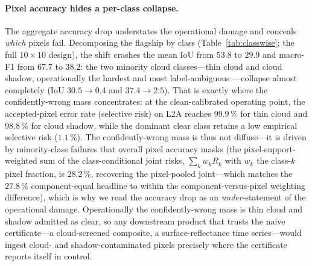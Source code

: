 \documentclass[preprint,3p,times]{elsarticle}
\begin{document}
\paragraph{Pixel accuracy hides a per-class collapse.} The aggregate accuracy drop understates the operational damage and conceals \emph{which} pixels fail. Decomposing the flagship by class (Table~\ref{tab:classwise}; the full $10\times10$ design), the shift crashes the mean IoU from $53.8$ to $29.9$ and macro-F1 from $67.7$ to $38.2$: the two minority cloud classes---thin cloud and cloud shadow, operationally the hardest and most label-ambiguous \citep{aybar2022cloudsen12}---collapse almost completely (IoU $30.5\to0.4$ and $37.4\to2.5$). That is exactly where the confidently-wrong mass concentrates: at the clean-calibrated operating point, the accepted-pixel error rate (selective risk) on L2A reaches $99.9\,\%$ for thin cloud and $98.8\,\%$ for cloud shadow, while the dominant clear class retains a low empirical selective risk ($1.1\,\%$). The confidently-wrong mass is thus not diffuse---it is driven by minority-class failures that overall pixel accuracy masks (the pixel-support-weighted sum of the class-conditional joint risks, $\sum_k w_k R_k$ with $w_k$ the class-$k$ pixel fraction, is $28.2\,\%$, recovering the pixel-pooled joint---which matches the $27.8\,\%$ component-equal headline to within the component-versus-pixel weighting difference), which is why we read the accuracy drop as an \emph{under}-statement of the operational damage. Operationally the confidently-wrong mass is thin cloud and shadow admitted as clear, so any downstream product that trusts the naive certificate---a cloud-screened composite, a surface-reflectance time series---would ingest cloud- and shadow-contaminated pixels precisely where the certificate reports itself in control.
\end{document}
